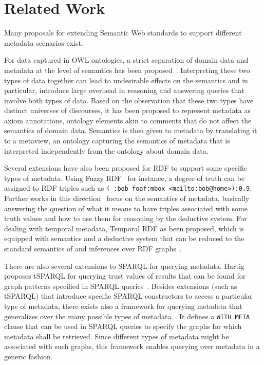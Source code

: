 \section{Related Work} \label{Section:RelWork}
Many proposals for extending Semantic Web standards to support different metadata scenarios exist. 

For data captured in OWL ontologies, a strict separation of domain data and metadata at the level of semantics has been proposed~\cite{DBLP:conf/aaai/TranHMGH08}. Interpreting these two types of data together can lead to undesirable effects on the semantics and in particular, introduce large overhead in reasoning and answering queries that involve both types of data. Based on the observation that these two types have distinct universes of discourses, it has been proposed to represent metadata as axiom annotations, ontology elements akin to comments that do not affect the semantics of domain data. Semantics is then given to metadata by translating it to a metaview, an ontology capturing the semantics of metadata that is interpreted independently from the ontology about domain data.  

Several extensions have also been proposed for RDF to support some specific types of metadata. Using Fuzzy RDF~\cite{DBLP:conf/rr/Straccia09} for instance, a degree of truth can be assigned to RDF triples such as \verb+(_:bob foaf:mbox <mailto:bob@home>):0.9+. Further works in this direction~\cite{swap2004,DBLP:conf/semweb/MazzieriD05} focus on the semantics of metadata, basically answering the question of what it means to have triples associated with some truth values and how to use them for reasoning by the deductive system. For dealing with temporal metadata, Temporal RDF as been proposed, which is equipped with semantics and a deductive system that can be reduced to the standard semantics of and inferences over RDF graphs~\cite{DBLP:journals/tkde/GutierrezHV07}. 

There are also several extensions to SPARQL for querying metadata. Hartig proposes tSPARQL for querying trust values of results that can be found for graph patterns specified in SPARQL queries~\cite{DBLP:conf/esws/Hartig09}. Besides extensions (such as tSPARQL) that introduce specific SPARQL constructors to access a particular type of metadata, there exists also a framework for querying metadata that generalizes over the many possible types of metadata~\cite{DBLP:conf/www/SchuelerSST08}. It defines a \verb+WITH META+ clause that can be used in SPARQL queries to specify the graphs for which metadata shall be retrieved. Since different types of metadata might be associated with such graphs, this framework enables querying over metadata in a generic fashion.  

